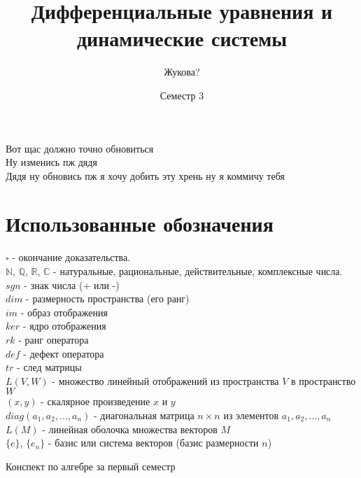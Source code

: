 \documentclass[a4paper]{book}
\title{Дифференциальные уравнения и динамические системы}
\date{Семестр 3}
\author{Жукова?}
\begin{document}
\maketitle
\tableofcontents
\newpage
%
Вот щас должно точно обновиться\\
Ну изменись пж дядя\\
Дядя ну обновись пж я хочу добить эту хрень ну я коммичу тебя\\
\section{Использованные обозначения}
$\square$ - окончание доказательства. \\
$\mathbb N,\,\mathbb Q,\,\mathbb R,\,\mathbb C$ - натуральные, рациональные,
действительные, комплексные числа.\\
$sgn$ - знак числа (+ или -)\\
$dim$ - размерность пространства (его ранг)\\
$im$ - образ отображения\\
$ker$ - ядро отображения\\
$rk$ - ранг оператора\\
$def$ - дефект оператора\\
$tr$ - след матрицы\\
$L(V,W)$ - множество линейный отображений из пространства $V$ в 
пространство $W$\\
$(x,y)$ - скалярное произведение $x$ и $y$\\
$diag(a_1,a_2,...,a_n)$ - диагональная матрица $n\times n$ из элементов
$a_1,a_2,...,a_n$\\
$L(M)$ - линейная оболочка множества векторов $M$\\
$\{e\}$, $\{e_n\}$ - базис или система векторов (базис размерности $n$)\\

\begin{thebibliography}{}
Конспект по алгебре за первый семестр
\end{thebibliography}
\end{document}
